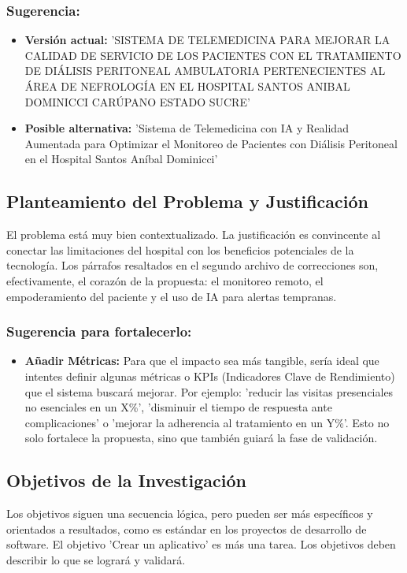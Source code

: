 \documentclass[12pt,a4paper]{article}
\begin{document}
\subsubsection*{Sugerencia:}
\begin{itemize}
    \item \textbf{Versión actual:} 'SISTEMA DE TELEMEDICINA PARA MEJORAR LA CALIDAD DE SERVICIO DE LOS 
    PACIENTES CON EL TRATAMIENTO DE DIÁLISIS PERITONEAL AMBULATORIA PERTENECIENTES AL ÁREA DE NEFROLOGÍA 
    EN EL HOSPITAL SANTOS ANIBAL DOMINICCI CARÚPANO ESTADO SUCRE'
    \item \textbf{Posible alternativa:} 'Sistema de Telemedicina con IA y Realidad Aumentada para 
    Optimizar el Monitoreo de Pacientes con Diálisis Peritoneal en el Hospital Santos Aníbal 
    Dominicci'
\end{itemize}

\subsection{Planteamiento del Problema y Justificación}
El problema está muy bien contextualizado. La justificación es convincente al conectar las limitaciones 
del hospital con los beneficios potenciales de la tecnología. Los párrafos resaltados en el segundo 
archivo de correcciones son, efectivamente, el corazón de la propuesta: el monitoreo remoto, el 
empoderamiento del paciente y el uso de IA para alertas tempranas.

\subsubsection*{Sugerencia para fortalecerlo:}
\begin{itemize}
    \item \textbf{Añadir Métricas:} Para que el impacto sea más tangible, sería ideal que  
    intentes definir algunas métricas o KPIs (Indicadores Clave de Rendimiento) que el 
    sistema buscará mejorar. Por ejemplo: 'reducir las visitas presenciales no esenciales en un X\%', 
    'disminuir el tiempo de respuesta ante complicaciones' o 'mejorar la adherencia al tratamiento en 
    un Y\%'. Esto no solo fortalece la propuesta, sino que también guiará la fase de validación.
\end{itemize}

\subsection{Objetivos de la Investigación}
Los objetivos siguen una secuencia lógica, pero pueden ser más específicos y orientados a resultados, 
como es estándar en los proyectos de desarrollo de software. El objetivo 'Crear un aplicativo' es más 
una tarea. Los objetivos deben describir lo que se logrará y validará.
\end{document}
